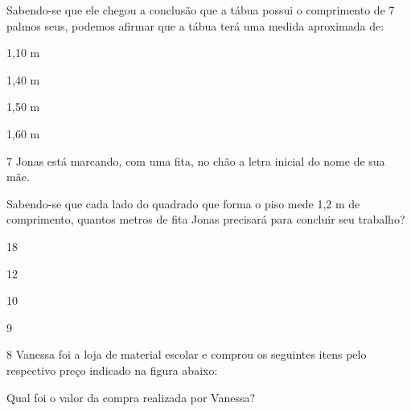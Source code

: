 
Sabendo-se que ele chegou a conclusão que a tábua possui o comprimento
de 7 palmos seus, podemos afirmar que a tábua terá uma medida aproximada
de:

\begin{escolha}
\item
  1,10 m
\item
  1,40 m
\item
  1,50 m
\item
  1,60 m
\end{escolha}


\num{7} Jonas está marcando, com uma fita, no chão a letra inicial do nome
de sua mãe.


Sabendo-se que cada lado do quadrado que forma o piso mede 1,2 m de
comprimento, quantos metros de fita Jonas precisará para concluir seu
trabalho?

\begin{escolha}
\item
  18
\item
  12
\item
  10
\item
  9
\end{escolha}


\num{8} Vanessa foi a loja de material escolar e comprou os seguintes itens
pelo respectivo preço indicado na figura abaixo:


Qual foi o valor da compra realizada por Vanessa?

